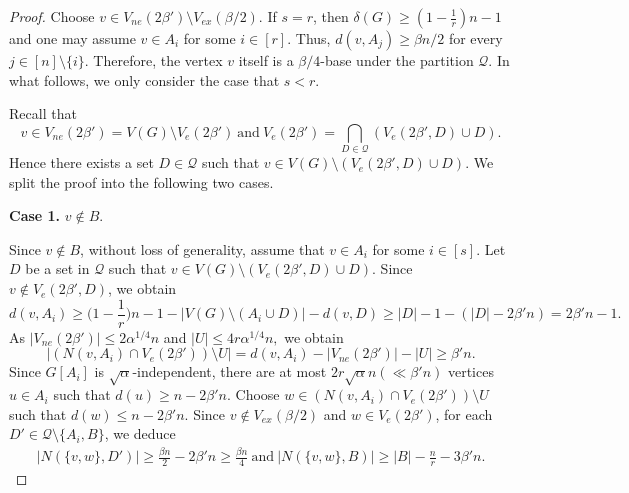 \documentclass[11pt, a4paper]{article}
\theoremstyle{definition}
\newcommand{\<}{\subseteq}
\begin{document}
\begin{proof}
Choose $v\in V_{ne}(2\beta')\setminus V_{ex}(\beta/2)$. If $s=r$, then $\delta(G)\geq (1-\frac{1}{r})n-1$ and one may assume $v\in A_i$ for some $i\in [r]$. Thus, $d(v,
A_j)\ge \beta n/2$ for every $j\in [n]\setminus \{i\}$. Therefore, the vertex $v$ itself is a $\beta/4$-base under the partition $\mathcal{Q}$. In what follows, we only consider the case that $s<r$. 

Recall that 
$$
v\in V_{ne}(2\beta')=V(G)\setminus V_{e}(2\beta')\ \text{and}\ V_{e}(2\beta')=\bigcap_{D\in \mathcal{Q}}(V_e(2\beta',D)\cup D).
$$
Hence there exists a set $D\in \mathcal{Q}$ such that $v\in V(G)\setminus (V_{e}(2\beta',D)\cup D)$. We split the proof into the following two cases. 

\medskip
\textbf{Case 1.} $v\notin B$. %
\medskip


Since $v\notin B$, without loss of generality, assume that $v\in A_i$ for some $i\in [s]$. Let $D$ be a set in $\mathcal{Q}$ such that $v\in V(G)\setminus (V_{e}(2\beta',D)\cup D)$. 
Since $v\notin V_e(2\beta',D)$, we obtain 
$$
d(v,A_i)\geq \Big(1-\frac{1}{r}\Big)n-1-|V(G)\setminus (A_i\cup D)|-d(v,D)\geq |D|-1-(|D|-2\beta'n)=
2\beta' n-1.
$$
As $|V_{ne}(2\beta')| \le  2\alpha^{1/4}n$ and $|U|\le 4r\alpha^{1/4} n,$ we obtain %
$$\big|(N(v, A_i)\cap V_e(2\beta' ))\setminus U\big|=d(v,A_i)-|V_{ne}(2\beta')|-|U|\ge \beta' n.$$
Since $G[A_i]$ is $\sqrt
{\alpha}$-independent, there are at most $2r\sqrt{\alpha} n (\ll \beta'n)$ vertices $u\in A_i$ such that $d(u)\ge n-2\beta' n$.
Choose $w\in (N(v, A_i)\cap V_e(2\beta' ))\setminus U$ such that $d(w)\le n- 2\beta' n$. %
Since $v\notin V_{ex}(\beta/2)$ and $w\in V_e(2\beta')$, for each $D'\in \mathcal{Q}\setminus \{A_i,B\}$, we deduce  
\begin{align}\label{eq:uv-co}
    |N(\{v,w\},D')|\ge \frac{\beta n}{2}-2\beta'n\geq\frac{\beta n}{4}\ \text{and}\ |N(\{v,w\},B)|\ge |B|-\frac{n}{r}-3\beta'n.
\end{align} %


\end{proof}
\end{document}
